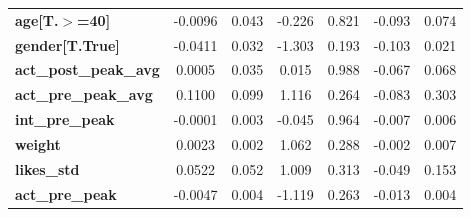 \begin{center}
\begin{tabular}{lcccccc}
\textbf{age[T.$>$=40]}        &      -0.0096  &        0.043     &    -0.226  &         0.821        &       -0.093    &        0.074     \\
\textbf{gender[T.True]}       &      -0.0411  &        0.032     &    -1.303  &         0.193        &       -0.103    &        0.021     \\
\textbf{act\_post\_peak\_avg} &       0.0005  &        0.035     &     0.015  &         0.988        &       -0.067    &        0.068     \\
\textbf{act\_pre\_peak\_avg}  &       0.1100  &        0.099     &     1.116  &         0.264        &       -0.083    &        0.303     \\
\textbf{int\_pre\_peak}       &      -0.0001  &        0.003     &    -0.045  &         0.964        &       -0.007    &        0.006     \\
\textbf{weight}               &       0.0023  &        0.002     &     1.062  &         0.288        &       -0.002    &        0.007     \\
\textbf{likes\_std}           &       0.0522  &        0.052     &     1.009  &         0.313        &       -0.049    &        0.153     \\
\textbf{act\_pre\_peak}       &      -0.0047  &        0.004     &    -1.119  &         0.263        &       -0.013    &        0.004     \\
\bottomrule
\end{tabular}
\end{center}